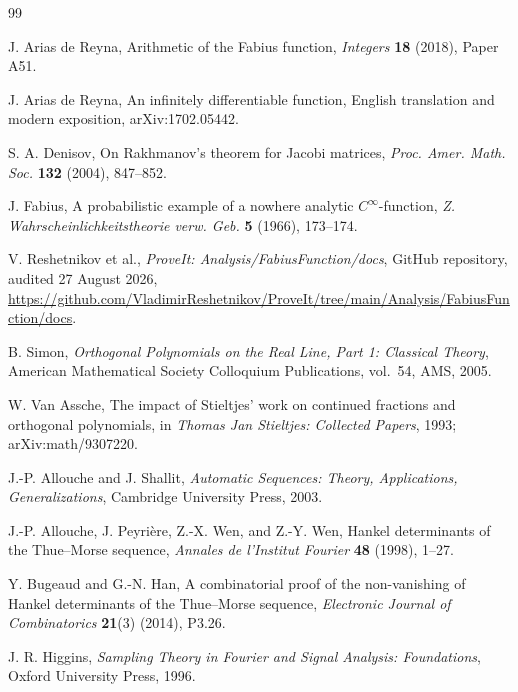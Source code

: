 \documentclass[11pt,oneside]{article}
\theoremstyle{definition}
\begin{document}
\begin{thebibliography}{99}

J. Arias de Reyna,
\newblock Arithmetic of the Fabius function,
\newblock \emph{Integers} \textbf{18} (2018), Paper A51.

J. Arias de Reyna,
\newblock An infinitely differentiable function,
\newblock English translation and modern exposition, arXiv:1702.05442.

S. A. Denisov,
\newblock On Rakhmanov's theorem for Jacobi matrices,
\newblock \emph{Proc. Amer. Math. Soc.} \textbf{132} (2004), 847--852.

J. Fabius,
\newblock A probabilistic example of a nowhere analytic \(C^\infty\)-function,
\newblock \emph{Z. Wahrscheinlichkeitstheorie verw. Geb.} \textbf{5} (1966), 173--174.

V. Reshetnikov et al.,
\newblock \emph{ProveIt: Analysis/FabiusFunction/docs},
\newblock GitHub repository, audited 27 August 2026,
\newblock \url{https://github.com/VladimirReshetnikov/ProveIt/tree/main/Analysis/FabiusFunction/docs}.

B. Simon,
\newblock \emph{Orthogonal Polynomials on the Real Line, Part 1: Classical Theory},
\newblock American Mathematical Society Colloquium Publications, vol.~54, AMS, 2005.

W. Van Assche,
\newblock The impact of Stieltjes' work on continued fractions and orthogonal polynomials,
\newblock in \emph{Thomas Jan Stieltjes: Collected Papers}, 1993; arXiv:math/9307220.



J.-P. Allouche and J. Shallit,
\newblock \emph{Automatic Sequences: Theory, Applications, Generalizations},
\newblock Cambridge University Press, 2003.

J.-P. Allouche, J. Peyri\`ere, Z.-X. Wen, and Z.-Y. Wen,
\newblock Hankel determinants of the Thue--Morse sequence,
\newblock \emph{Annales de l'Institut Fourier} \textbf{48} (1998), 1--27.

Y. Bugeaud and G.-N. Han,
\newblock A combinatorial proof of the non-vanishing of Hankel determinants of the
Thue--Morse sequence,
\newblock \emph{Electronic Journal of Combinatorics} \textbf{21}(3) (2014), P3.26.

J. R. Higgins,
\newblock \emph{Sampling Theory in Fourier and Signal Analysis: Foundations},
\newblock Oxford University Press, 1996.


\end{thebibliography}
\end{document}
